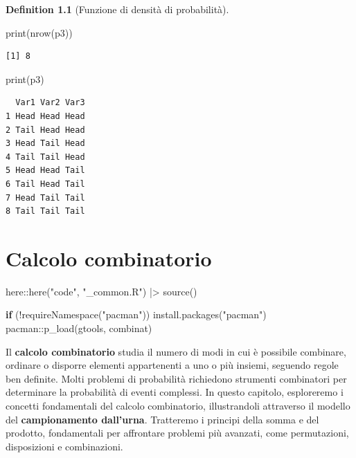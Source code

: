 \documentclass[
  letterpaper,
  DIV=11,
  numbers=noendperiod,
  oneside]{scrreprt}
\newenvironment{Shaded}{\begin{snugshade}}{\end{snugshade}}
\newcommand{\ControlFlowTok}[1]{\textcolor[rgb]{0.00,0.23,0.31}{\textbf{#1}}}
\newcommand{\FunctionTok}[1]{\textcolor[rgb]{0.28,0.35,0.67}{#1}}
\newcommand{\NormalTok}[1]{\textcolor[rgb]{0.00,0.23,0.31}{#1}}
\newcommand{\SpecialCharTok}[1]{\textcolor[rgb]{0.37,0.37,0.37}{#1}}
\newcommand{\StringTok}[1]{\textcolor[rgb]{0.13,0.47,0.30}{#1}}
\theoremstyle{definition}
\theoremstyle{plain}
\theoremstyle{definition}
\newtheorem{definition}{Definition}[chapter]
\theoremstyle{remark}
\begin{document}
\begin{definition}[Funzione di densità di
probabilità]
\begin{Shaded}
\begin{Highlighting}[]
\FunctionTok{print}\NormalTok{(}\FunctionTok{nrow}\NormalTok{(p3))}
\end{Highlighting}
\end{Shaded}

\begin{verbatim}
[1] 8
\end{verbatim}

\begin{Shaded}
\begin{Highlighting}[]
\FunctionTok{print}\NormalTok{(p3)}
\end{Highlighting}
\end{Shaded}

\begin{verbatim}
  Var1 Var2 Var3
1 Head Head Head
2 Tail Head Head
3 Head Tail Head
4 Tail Tail Head
5 Head Head Tail
6 Tail Head Tail
7 Head Tail Tail
8 Tail Tail Tail
\end{verbatim}

\chapter{Calcolo combinatorio}\label{sec-apx-combinatorics}

\begin{Shaded}
\begin{Highlighting}[]
\NormalTok{here}\SpecialCharTok{::}\FunctionTok{here}\NormalTok{(}\StringTok{"code"}\NormalTok{, }\StringTok{"\_common.R"}\NormalTok{) }\SpecialCharTok{|\textgreater{}}
    \FunctionTok{source}\NormalTok{()}

\ControlFlowTok{if}\NormalTok{ (}\SpecialCharTok{!}\FunctionTok{requireNamespace}\NormalTok{(}\StringTok{"pacman"}\NormalTok{)) }\FunctionTok{install.packages}\NormalTok{(}\StringTok{"pacman"}\NormalTok{)}
\NormalTok{pacman}\SpecialCharTok{::}\FunctionTok{p\_load}\NormalTok{(gtools, combinat)}
\end{Highlighting}
\end{Shaded}

Il \textbf{calcolo combinatorio} studia il numero di modi in cui è
possibile combinare, ordinare o disporre elementi appartenenti a uno o
più insiemi, seguendo regole ben definite. Molti problemi di probabilità
richiedono strumenti combinatori per determinare la probabilità di
eventi complessi. In questo capitolo, esploreremo i concetti
fondamentali del calcolo combinatorio, illustrandoli attraverso il
modello del \textbf{campionamento dall'urna}. Tratteremo i principi
della somma e del prodotto, fondamentali per affrontare problemi più
avanzati, come permutazioni, disposizioni e combinazioni.


\end{definition}
\end{document}
